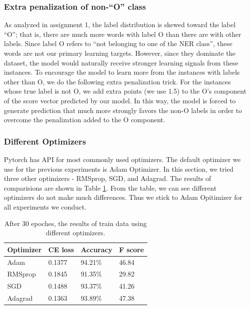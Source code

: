 \documentclass[11pt,a4paper]{article}
\begin{document}
\subsubsection{Extra penalization of non-``O'' class}

	As analyzed in assignment 1, the label distribution is skewed toward the label ``O''; that is, there are much more words with label O than there are with other labels. Since label O refers to ``not belonging to one of the NER class'', these words are not our primary learning targets. However, since they dominate the dataset, the model would naturally receive stronger learning signals from these instances. To encourage the model to learn more from the instances with labels other than O, we do the following extra penalization trick. For the instances whose true label is not O, we add extra points (we use 1.5) to the O's component of the score vector predicted by our model. In this way, the model is forced to generate prediction that much more strongly favors the non-O labels in order to overcome the penalization added to the O component.


\subsubsection{Different Optimizers}

Pytorch has API for most commonly used optimizers. The default optimizer we use for the previous experiments is Adam Optimizer. In this section, we tried three other optimizers - RMSprop, SGD, and Adagrad. The results of comparisions are shown in Table \ref{opti}. From the table, we can see different optimizers do not make much differences. Thus we stick to Adam Opitimizer for all experiments we conduct. 

    
\begin{table}[ht]
\centering
\caption{After 30 epoches, the results of train data using different optimizers.}
\label{opti}
\begin{tabular}{llll}
\hline
Optimizer        & CE loss & Accuracy & F score \\ \hline
Adam    & 0.1377  & 94.21\%  & 46.84   \\
RMSprop & 0.1845  & 91.35\%  & 29.82   \\
SGD     & 0.1488  & 93.37\%  & 41.26   \\
Adagrad & 0.1363  & 93.89\%  & 47.38   \\ \hline
\end{tabular}
\end{table}
\end{document}
